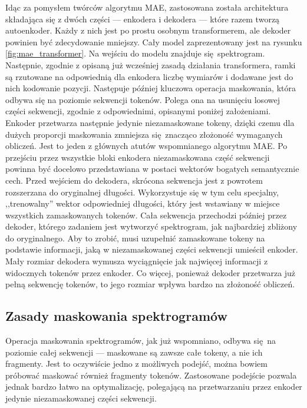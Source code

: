 Idąc za pomysłem twórców algorytmu MAE, zastosowana została architektura składająca się z dwóch części --- enkodera i dekodera --- które razem tworzą autoenkoder. Każdy z nich jest po prostu osobnym transformerem, ale dekoder powinien być zdecydowanie mniejszy. Cały model zaprezentowany jest na rysunku \ref{fig:mae_transformer}. Na wejściu do modelu znajduje się spektrogram. Następnie, zgodnie z opisaną już wcześniej zasadą działania transformera, ramki są rzutowane na odpowiednią dla enkodera liczbę wymiarów i dodawane jest do nich kodowanie pozycji. Następuje później kluczowa operacja maskowania, która odbywa się na poziomie sekwencji tokenów. Polega ona na usunięciu losowej części sekwencji, zgodnie z odpowiednimi, opisanymi poniżej założeniami. Enkoder przetwarza następnie jedynie niezamaskowane tokeny, dzięki czemu dla dużych proporcji maskowania zmniejsza się znacząco złożoność wymaganych obliczeń. Jest to jeden z głównych atutów wspomnianego algorytmu MAE. Po przejściu przez wszystkie bloki enkodera niezamaskowana część sekwencji powinna być docelowo przedstawiana w postaci wektorów bogatych semantycznie cech. Przed wejściem do dekodera, skrócona sekwencja jest z powrotem rozszerzana do oryginalnej długości. Wykorzystuje się w tym celu specjalny, ,,trenowalny'' wektor odpowiedniej długości, który jest wstawiany w miejsce wszystkich zamaskowanych tokenów. Cała sekwencja przechodzi później przez dekoder, którego zadaniem jest wytworzyć spektrogram, jak najbardziej zbliżony do oryginalnego. Aby to zrobić, musi uzupełnić zamaskowane tokeny na podstawie informacji, jaką w niezamaskowanej części sekwencji umieścił enkoder. Mały rozmiar dekodera wymusza wyciągnięcie jak najwięcej informacji z widocznych tokenów przez enkoder. Co więcej, ponieważ dekoder przetwarza już pełną sekwencję tokenów, to jego rozmiar wpływa bardzo na złożoność obliczeń.

\subsection{Zasady maskowania spektrogramów}

Operacja maskowania spektrogramów, jak już wspomniano, odbywa się na poziomie całej sekwencji --- maskowane są zawsze całe tokeny, a nie ich fragmenty. Jest to oczywiście jedno z możliwych podejść, można bowiem próbować maskować również fragmenty tokenów. Zastosowane podejście pozwala jednak bardzo łatwo na optymalizację, polegającą na przetwarzaniu przez enkoder jedynie niezamaskowanej części sekwencji.


